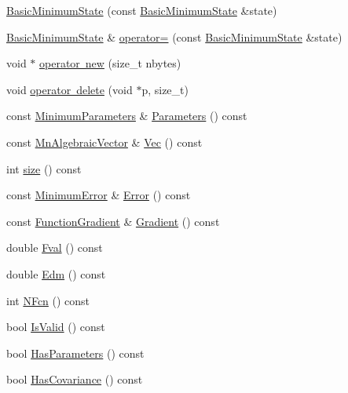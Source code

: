 \begin{DoxyCompactItemize}
\mbox{\hyperlink{classROOT_1_1Minuit2_1_1BasicMinimumState_af76fc4a4cc111099fd188e145fa82b5c}{Basic\+Minimum\+State}} (const \mbox{\hyperlink{classROOT_1_1Minuit2_1_1BasicMinimumState}{Basic\+Minimum\+State}} \&state)
\item 
\mbox{\hyperlink{classROOT_1_1Minuit2_1_1BasicMinimumState}{Basic\+Minimum\+State}} \& \mbox{\hyperlink{classROOT_1_1Minuit2_1_1BasicMinimumState_a68cf1c28f5f728fa62a0c39ff943a2bf}{operator=}} (const \mbox{\hyperlink{classROOT_1_1Minuit2_1_1BasicMinimumState}{Basic\+Minimum\+State}} \&state)
\item 
void $\ast$ \mbox{\hyperlink{classROOT_1_1Minuit2_1_1BasicMinimumState_ad0e5ab496757c5bee3544485a49fe7aa}{operator new}} (size\+\_\+t nbytes)
\item 
void \mbox{\hyperlink{classROOT_1_1Minuit2_1_1BasicMinimumState_a19ccca7f7825c16fca3c7ab6f147fdd6}{operator delete}} (void $\ast$p, size\+\_\+t)
\item 
const \mbox{\hyperlink{classROOT_1_1Minuit2_1_1MinimumParameters}{Minimum\+Parameters}} \& \mbox{\hyperlink{classROOT_1_1Minuit2_1_1BasicMinimumState_a0b72fce84557374c989a6581711e6e6a}{Parameters}} () const
\item 
const \mbox{\hyperlink{namespaceROOT_1_1Minuit2_a62ed97730a1ca8d3fbaec64a19aa11c9}{Mn\+Algebraic\+Vector}} \& \mbox{\hyperlink{classROOT_1_1Minuit2_1_1BasicMinimumState_a43ea742b5bd55d2c4e9d6b75308fb875}{Vec}} () const
\item 
int \mbox{\hyperlink{classROOT_1_1Minuit2_1_1BasicMinimumState_a12c3b0b51b127384c53029c54c984590}{size}} () const
\item 
const \mbox{\hyperlink{classROOT_1_1Minuit2_1_1MinimumError}{Minimum\+Error}} \& \mbox{\hyperlink{classROOT_1_1Minuit2_1_1BasicMinimumState_a67a7536f33473e23c3461e0c7029e5c5}{Error}} () const
\item 
const \mbox{\hyperlink{classROOT_1_1Minuit2_1_1FunctionGradient}{Function\+Gradient}} \& \mbox{\hyperlink{classROOT_1_1Minuit2_1_1BasicMinimumState_a45b6c728054b409349fb2f6f725a8ab6}{Gradient}} () const
\item 
double \mbox{\hyperlink{classROOT_1_1Minuit2_1_1BasicMinimumState_a5151d99e7c6cd7f3b070ad2c62222010}{Fval}} () const
\item 
double \mbox{\hyperlink{classROOT_1_1Minuit2_1_1BasicMinimumState_a20ae93898c8b726d9e36c40160d23fa9}{Edm}} () const
\item 
int \mbox{\hyperlink{classROOT_1_1Minuit2_1_1BasicMinimumState_ac4566e929ac5ec9fe2dba914bb21207b}{N\+Fcn}} () const
\item 
bool \mbox{\hyperlink{classROOT_1_1Minuit2_1_1BasicMinimumState_af92e32efe08fa047bc433db6f058d11a}{Is\+Valid}} () const
\item 
bool \mbox{\hyperlink{classROOT_1_1Minuit2_1_1BasicMinimumState_a1af83c0464c727dc173834c1612f5e49}{Has\+Parameters}} () const
\item 
bool \mbox{\hyperlink{classROOT_1_1Minuit2_1_1BasicMinimumState_a9d43155058c576759d062561d77b3e1d}{Has\+Covariance}} () const
\end{DoxyCompactItemize}


